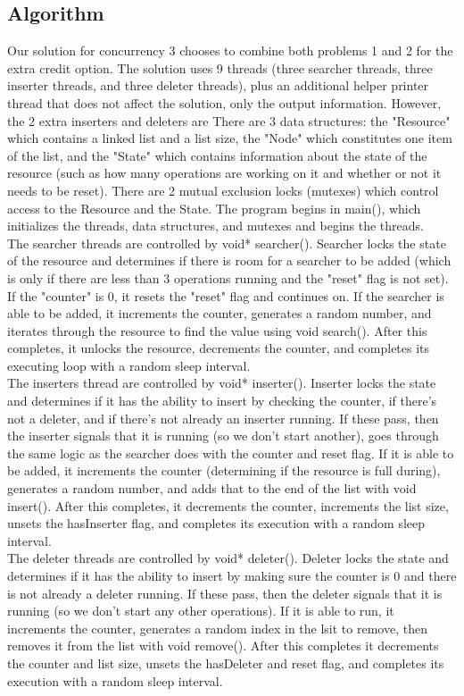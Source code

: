 \documentclass[onecolumn, draftclsnofoot,10pt, compsoc]{IEEEtran}
\begin{document}
\begin{singlespace}
\subsection*{Algorithm}
    Our solution for concurrency 3 chooses to combine both problems 1 and 2 for the extra credit option. The solution uses 9 threads (three searcher threads, three inserter threads, and three deleter threads), plus an additional helper printer thread that does not affect the solution, only the output information. However, the 2 extra inserters and deleters are There are 3 data structures: the "Resource" which contains a linked list and a list size, the "Node" which constitutes one item of the list, and the "State" which contains information about the state of the resource (such as how many operations are working on it and whether or not it needs to be reset). There are 2 mutual exclusion locks (mutexes) which control access to the Resource and the State. The program begins in main(), which initializes the threads, data structures, and mutexes and begins the threads. \\
    The searcher threads are controlled by void* searcher(). Searcher locks the state of the resource and determines if there is room for a searcher to be added (which is only if there are less than 3 operations running and the "reset" flag is not set). If the "counter" is 0, it resets the "reset" flag and continues on. If the searcher is able to be added, it increments the counter, generates a random number, and iterates through the resource to find the value using void search(). After this completes, it unlocks the resource, decrements the counter, and completes its executing loop with a random sleep interval. \\
    The inserters thread are controlled by void* inserter(). Inserter locks the state and determines if it has the ability to insert by checking the counter, if there's not a deleter, and if there's not already an inserter running. If these pass, then the inserter signals that it is running (so we don't start another), goes through the same logic as the searcher does with the counter and reset flag. If it is able to be added, it increments the counter (determining if the resource is full during), generates a random number, and adds that to the end of the list with void insert(). After this completes, it decrements the counter, increments the list size, unsets the hasInserter flag, and completes its execution with a random sleep interval. \\
    The deleter threads are controlled by void* deleter(). Deleter locks the state and determines if it has the ability to insert by making sure the counter is 0 and there is not already a deleter running. If these pass, then the deleter signals that it is running (so we don't start any other operations). If it is able to run, it increments the counter, generates a random index in the lsit to remove, then removes it from the list with void remove(). After this completes it decrements the counter and list size, unsets the hasDeleter and reset flag, and completes its execution with a random sleep interval. \\

\end{singlespace}
\end{document}
